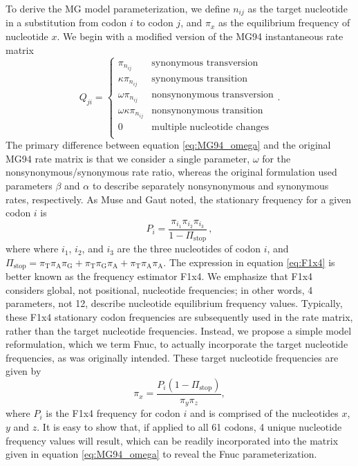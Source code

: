 \documentclass{pnastwo}
\begin{document}
\begin{article}
To derive the MG model parameterization, we define $n_{ij}$ as the target nucleotide in a substitution from codon $i$ to codon $j$, and $\pi_x$ as the equilibrium frequency of nucleotide $x$. We begin with a modified version of the MG94 \cite{MuseGaut1994} instantaneous rate matrix 
\begin{equation}\label{eq:MG94_omega}
Q_{ji} = \left\{ 
\begin{array}{rl}
\pi_{n_{ij}}                &\mbox{synonymous transversion} \\
\kappa \pi_{n_{ij}}         &\mbox{synonymous transition} \\
\omega \pi_{n_{ij}}         &\mbox{nonsynonymous transversion} \\
\omega \kappa \pi_{n_{ij}}  &\mbox{nonsynonymous transition} \\
0                           &\mbox{multiple nucleotide changes} \\           
\end{array} \right..
\end{equation}
The primary difference between equation \eqref{eq:MG94_omega} and the original MG94 rate matrix is that we consider a single parameter, $\omega$ for the nonsynonymous/synonymous rate ratio, whereas the original formulation used parameters $\beta$ and $\alpha$ to describe separately nonsynonymous and synonymous rates, respectively. As Muse and Gaut \cite{MuseGaut1994} noted, the stationary frequency for a given codon $i$ is
\begin{equation}\label{eq:F1x4}
P_i = \frac{\pi_{i_1}\pi_{i_2}\pi_{i_3}}{1 - \Pi_\text{stop}} \,,
\end{equation}
where where $i_1$, $i_2$, and $i_3$ are the three nucleotides of codon $i$, and  $\Pi_\text{stop} = \pi_\text{T}\pi_\text{A}\pi_\text{G} + \pi_\text{T}\pi_\text{G}\pi_\text{A} + \pi_\text{T}\pi_\text{A}\pi_\text{A}$. The expression in equation \eqref{eq:F1x4} is better known as the frequency estimator F1x4. We emphasize that F1x4 considers global, not positional, nucleotide frequencies; in other words, 4 parameters, not 12, describe nucleotide equilibrium frequency values. Typically, these F1x4 stationary codon frequencies are subsequently used in the rate matrix, rather than the target nucleotide frequencies. Instead, we propose a simple model reformulation, which we term Fnuc, to actually incorporate the target nucleotide frequencies, as was originally intended. These target nucleotide frequencies are given by 
\begin{equation}
\pi_x = \frac{P_i(1 - \Pi_\text{stop})}{\pi_y\pi_z}, 
\end{equation} where $P_i$ is the F1x4 frequency for codon $i$ and is comprised of the nucleotides $x$, $y$ and $z$. It is easy to show that, if applied to all 61 codons, 4 unique nucleotide frequency values will result, which can be readily incorporated into the matrix given in equation \eqref{eq:MG94_omega} to reveal the Fnuc parameterization.


\end{article}
\end{document}
